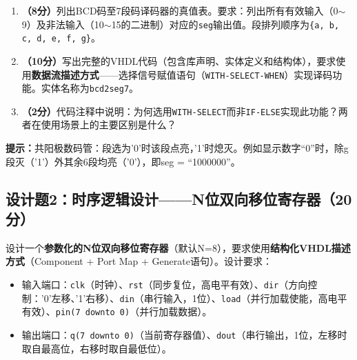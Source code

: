 \begin{enumerate}[label=(\arabic*)]
  \item \textbf{（8分）}列出BCD码至7段码译码器的真值表。要求：列出所有有效输入（0$\sim$9）及非法输入（10$\sim$15的二进制）对应的\texttt{seg}输出值。段排列顺序为\texttt{\{a, b, c, d, e, f, g\}}。
  \item \textbf{（10分）}写出完整的VHDL代码（包含库声明、实体定义和结构体），要求使用\textbf{数据流描述方式}——选择信号赋值语句（\texttt{WITH-SELECT-WHEN}）实现译码功能。实体名称为\texttt{bcd2seg7}。
  \item \textbf{（2分）}代码注释中说明：为何选用\texttt{WITH-SELECT}而非\texttt{IF-ELSE}实现此功能？两者在使用场景上的主要区别是什么？
\end{enumerate}

\begin{framed}
\textbf{提示：}共阳极数码管：段选为'0'时该段点亮，'1'时熄灭。例如显示数字``0''时，除g段灭（'1'）外其余6段均亮（'0'），即seg = ``1000000''。
\end{framed}

\subsection*{设计题2：时序逻辑设计——N位双向移位寄存器（20分）}

设计一个\textbf{参数化的N位双向移位寄存器}（默认N=8），要求使用\textbf{结构化VHDL描述方式}（Component + Port Map + Generate语句）。设计要求：

\begin{itemize}
  \item 输入端口：\texttt{clk}（时钟）、\texttt{rst}（同步复位，高电平有效）、\texttt{dir}（方向控制：'0'左移、'1'右移）、\texttt{din}（串行输入，1位）、\texttt{load}（并行加载使能，高电平有效）、\texttt{pin(7 downto 0)}（并行加载数据）。
  \item 输出端口：\texttt{q(7 downto 0)}（当前寄存器值）、\texttt{dout}（串行输出，1位，左移时取自最高位，右移时取自最低位）。
\end{itemize}

